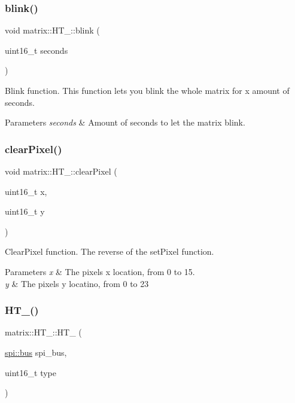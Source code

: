 \subsubsection{\texorpdfstring{blink()}{blink()}}
{\footnotesize\ttfamily void matrix\+::\+H\+T\+\_\+::blink (\begin{DoxyParamCaption}\item[{uint16\+\_\+t}]{seconds }\end{DoxyParamCaption})}



Blink function. This function lets you blink the whole matrix for x amount of seconds. 


\begin{DoxyParams}{Parameters}
{\em seconds} & Amount of seconds to let the matrix blink. \\
\hline
\end{DoxyParams}
\mbox{\label{group___h_t__1632_ga51370333005f486fb0d2877fe459e596}} 
\subsubsection{\texorpdfstring{clear\+Pixel()}{clearPixel()}}
{\footnotesize\ttfamily void matrix\+::\+H\+T\+\_\+::clear\+Pixel (\begin{DoxyParamCaption}\item[{uint16\+\_\+t}]{x,  }\item[{uint16\+\_\+t}]{y }\end{DoxyParamCaption})}



Clear\+Pixel function. The reverse of the set\+Pixel function. 


\begin{DoxyParams}{Parameters}
{\em x} & The pixel\textquotesingle{}s x location, from 0 to 15. \\
\hline
{\em y} & The pixel\textquotesingle{}s y locatino, from 0 to 23 \\
\hline
\end{DoxyParams}
\mbox{\label{group___h_t__1632_ga6f2a79fd8a1be6e44b847d8548962400}} 
\subsubsection{\texorpdfstring{H\+T\+\_()}{HT\_1632()}}
{\footnotesize\ttfamily matrix\+::\+H\+T\+\_\+::\+H\+T\+\_ (\begin{DoxyParamCaption}\item[{\hyperlink{classspi_1_1bus}{spi\+::bus}}]{spi\+\_\+bus,  }\item[{uint16\+\_\+t}]{type }\end{DoxyParamCaption})}



